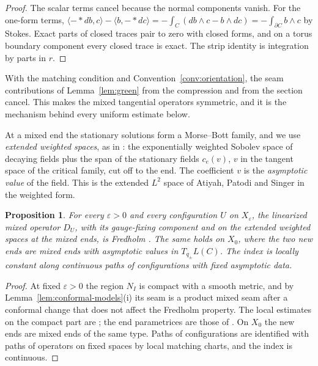 \documentclass[11pt]{amsart}
\newtheorem{proposition}[theorem]{Proposition}
\theoremstyle{definition}
\theoremstyle{remark}
\theoremstyle{plain}
\numberwithin{equation}{section}
\newcommand{\eps}{\varepsilon}
\begin{document}
\begin{proof}
The scalar terms cancel because the normal components vanish. For the
one-form terms, $\langle-*db,c\rangle-\langle b,-*dc\rangle
=-\int_C(db\wedge c-b\wedge dc)=-\int_{\partial C}b\wedge c$ by Stokes.
Exact parts of closed traces pair to zero with closed forms, and on a
torus boundary component every closed trace is exact. The strip identity
is integration by parts in $r$.
\end{proof}

With the matching condition and Convention~\ref{conv:orientation}, the
seam contributions of Lemma~\ref{lem:green} from the compression and from
the section cancel. This makes the mixed tangential operators symmetric,
and it is the mechanism behind every uniform estimate below.

At a mixed end the stationary solutions form a Morse--Bott family, and we use
\emph{extended weighted spaces}, as in \cite[Definitions~3.8--3.9]{DFL}: the
exponentially weighted Sobolev space of decaying fields plus the span of the
stationary fields $c_e(v)$, $v$ in the tangent space of the critical family,
cut off to the end. The coefficient $v$ is the \emph{asymptotic value} of the
field. This is the extended $L^2$ space of Atiyah, Patodi and Singer
\cite{APS} in the weighted form.

\begin{proposition}\label{prop:fredholm}
For every $\eps>0$ and every configuration $U$ on $X_\eps$, the linearized
mixed operator $D_U$, with its gauge-fixing component and on the extended
weighted spaces at the mixed ends, is Fredholm \cite[Proposition~3.18]{DFL}. The same holds on $X_0$, where the two new
ends are mixed ends with asymptotic values in $T_{q_\pm}L(C)$. The index is
locally constant along continuous paths of configurations
with fixed asymptotic data.
\end{proposition}

\begin{proof}
At fixed $\eps>0$ the region $N_I$ is compact with a smooth metric, and by
Lemma~\ref{lem:conformal-models}(i) its seam is a product mixed seam after
a conformal change that does not affect the Fredholm property. The local
estimates on the compact part are \cite[Theorem~4.17 and Remark~4.19]{DFL};
the end parametrices are those of \cite[Section~4.2.1]{DFL}. On $X_0$ the
new ends are mixed ends of the same type. Paths of configurations are identified with paths of operators on fixed spaces by
local matching charts, and the index is continuous.
\end{proof}
\end{document}
